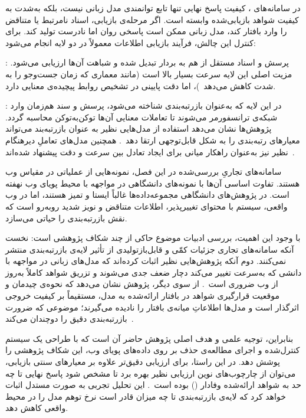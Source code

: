 
در سامانه‌های ، کیفیت پاسخ نهایی تنها تابع توانمندی مدل زبانی نیست، بلکه به‌شدت به کیفیت شواهد بازیابی‌شده وابسته است. اگر مرحله‌ی بازیابی، اسناد نامرتبط یا متناقض را وارد بافتار کند، مدل زبانی ممکن است پاسخی روان اما نادرست تولید کند. برای کنترل این چالش، فرآیند بازیابی اطلاعات معمولاً در دو لایه انجام می‌شود:


: پرسش و اسناد مستقل از هم به بردار تبدیل شده و شباهت آن‌ها ارزیابی می‌شود. مزیت اصلی این لایه سرعت بسیار بالا است (مانند معماری  که زمان جست‌وجو را به شدت کاهش می‌دهد~)، اما دقت پایینی در تشخیص روابط پیچیده‌ی معنایی دارد.

: در این لایه که به‌عنوان بازرتبه‌بندی شناخته می‌شود، پرسش و سند هم‌زمان وارد شبکه‌ی ترانسفورمر می‌شوند تا تعاملات معنایی آن‌ها توکن‌به‌توکن محاسبه گردد. پژوهش‌ها نشان می‌دهد استفاده از مدل‌هایی نظیر  به عنوان بازرتبه‌بند می‌تواند معیارهای رتبه‌بندی را به شکل قابل‌توجهی ارتقا دهد~. همچنین مدل‌های تعاملِ دیرهنگام نظیر  نیز به‌عنوان راهکار میانی برای ایجاد تعادل بین سرعت و دقت پیشنهاد شده‌اند~.


سامانه‌های تجاریِ بررسی‌شده در این فصل، نمونه‌هایی از  عملیاتی در مقیاس وب هستند. تفاوت اساسی آن‌ها با نمونه‌های دانشگاهی در مواجهه با محیط پویای وب نهفته است. در پژوهش‌های دانشگاهی مجموعه‌داده‌ها غالباً ایستا و تمیز هستند، اما در وب واقعی، سیستم با محتوای تغییرپذیر، اطلاعات متناقض و نویز شدید روبه‌رو است که نقش بازرتبه‌بندی را حیاتی می‌سازد.

با وجود این اهمیت، بررسی ادبیات موضوع حاکی از چند شکاف پژوهشی است: نخست آنکه سامانه‌های تجاری جزئیات کمّی و قابل‌بازتولیدی از تأثیر لایه‌ی بازرتبه‌بندی منتشر نمی‌کنند. 
دوم آنکه پژوهش‌هایی نظیر  اثبات کرده‌اند که مدل‌های زبانی در مواجهه با دانشی که به‌سرعت تغییر می‌کند دچار ضعف جدی می‌شوند و تزریق شواهد کاملاً به‌روز از وب ضروری است~. 
از سوی دیگر، پژوهش  نشان می‌دهد که نحوه‌ی چیدمان و موقعیت قرارگیری شواهد در بافتار ارائه‌شده به مدل، مستقیماً بر کیفیت خروجی اثرگذار است و مدل‌ها اطلاعاتِ میانه‌ی بافتار را نادیده می‌گیرند؛ موضوعی که ضرورت بازرتبه‌بندی دقیق را دوچندان می‌کند~.

بنابراین، توجیه علمی و هدف اصلی پژوهش حاضر آن است که با طراحی یک سیستم کنترل‌شده و اجرای مطالعه‌ی حذف بر روی داده‌های پویای وب، این شکاف پژوهشی را پوشش دهد. در این راستا، برای ارزیابی دقیق‌تر علاوه بر معیارهای سنتی بازیابی، می‌توان از چارچوب‌های نوین ارزیابی نظیر  بهره برد تا مشخص شود پاسخ نهایی تا چه حد به شواهد ارائه‌شده وفادار () بوده است~. این تحلیل تجربی به صورت مستدل اثبات خواهد کرد که لایه‌ی بازرتبه‌بندی تا چه میزان قادر است نرخ توهم مدل را در محیط واقعی کاهش دهد.